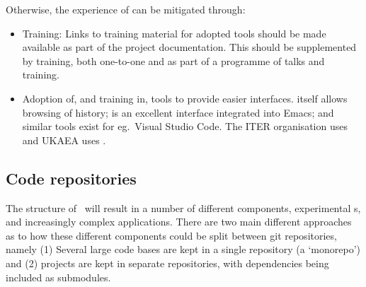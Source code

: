 Otherwise, the experience of  can be mitigated through:
\begin{itemize}
\item Training: Links to training material for adopted tools should be made available
as part of the project documentation. This should be supplemented by training,
both one-to-one and as part of a programme of talks and training.

\item Adoption of, and training in, tools to provide easier interfaces.  itself
allows browsing of history;  is an excellent interface integrated into Emacs;
and similar tools exist for eg.\ Visual Studio Code.
The ITER organisation uses  and UKAEA uses .
\end{itemize}


\subsection{Code repositories} \label{sec:repo}

The structure of \exc \  will result in a number of different
components, experimental \papp s, and increasingly complex
applications. There are two main different approaches as to how these different
components could be split between git repositories, namely (1) Several large code
bases are kept in a single repository (a `monorepo') and (2) 
projects are kept in  separate repositories, with
dependencies being included as  submodules. 


